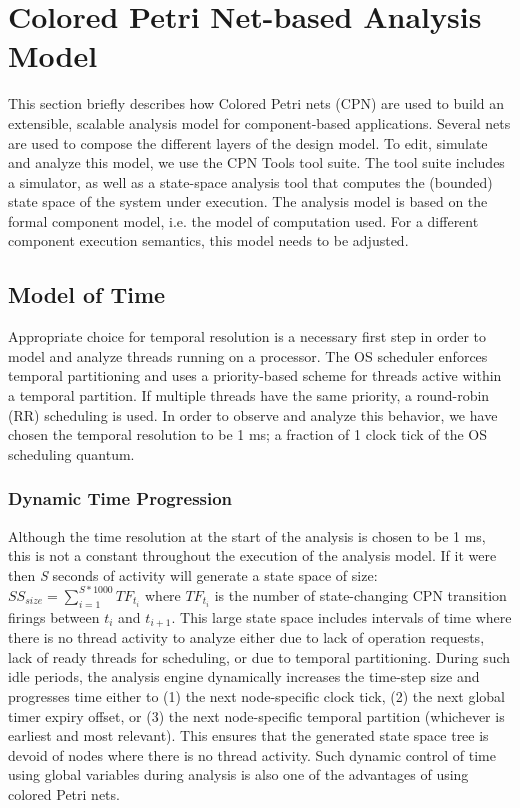 \section{Colored Petri Net-based Analysis Model}
\label{sec:Colored_Petri Net-based_Analysis_Model}

This section briefly describes how Colored Petri nets (CPN) are used to build an extensible, scalable analysis model for component-based applications. Several nets are used to compose the different layers of the design model. To edit, simulate and analyze this model, we use the CPN Tools \cite{CPNTools} tool suite. The tool suite includes a simulator, as well as a state-space analysis tool that computes the (bounded) state space of the system under execution. The analysis model is based on the formal component model, i.e. the model of computation used. For a different component execution semantics, this model needs to be adjusted. 

\subsection{Model of Time}
Appropriate choice for temporal resolution is a necessary first step in order to model and analyze threads running on a processor. The OS scheduler enforces temporal partitioning and uses a priority-based scheme for threads active within a temporal partition. If multiple threads have the same priority, a round-robin (RR) scheduling is used. In order to observe and analyze this behavior, we have chosen the temporal resolution to be 1 ms; a fraction of 1 clock tick of the OS scheduling quantum. 
\subsubsection{Dynamic Time Progression}
Although the time resolution at the start of the analysis is chosen to be 1 ms, this is not a constant throughout the execution of the analysis model. If it were then \emph{S} seconds of activity will generate a state space of size: $SS_{size} = \sum\limits_{i=1}^{S*1000} TF_{t_i}$
%
where $TF_{t_i}$ is the number of state-changing CPN transition firings between $t_i$ and $t_{i+1}$. This large state space includes intervals of time where there is no thread activity to analyze either due to lack of operation requests, lack of ready threads for scheduling, or due to temporal partitioning. During such idle periods, the analysis engine dynamically increases the time-step size and progresses time either to (1) the next node-specific clock tick, (2) the next global timer expiry offset, or (3) the next node-specific temporal partition (whichever is earliest and most relevant). This ensures that the generated state space tree is devoid of nodes where there is no thread activity. Such dynamic control of time using global variables during analysis is also one of the advantages of using colored Petri nets. 

